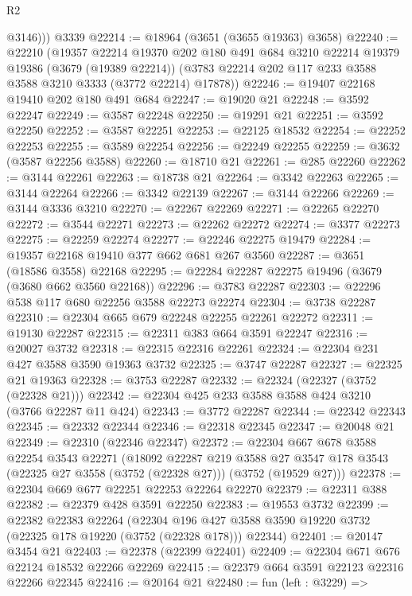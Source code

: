\begin{lexlean}{R2}
\begin{coremodule}
          @3146)))
    @3339
@22214 := @18964 (@3651 (@3655 @19363) @3658)
@22240 := @22210
    (@19357
      @22214
      @19370
      @202
      @180
      @491
      @684
      @3210
      @22214
      @19379
      @19386
      (@3679 (@19389 @22214))
      (@3783 @22214 @202 @117 @233 @3588 @3588 @3210 @3333 (@3772 @22214) @17878))
@22246 := @19407 @22168 @19410 @202 @180 @491 @684
@22247 := @19020 @21
@22248 := @3592 @22247
@22249 := @3587 @22248
@22250 := @19291 @21
@22251 := @3592 @22250
@22252 := @3587 @22251
@22253 := @22125 @18532
@22254 := @22252 @22253
@22255 := @3589 @22254
@22256 := @22249 @22255
@22259 := @3632 (@3587 @22256 @3588)
@22260 := @18710 @21
@22261 := @285 @22260
@22262 := @3144 @22261
@22263 := @18738 @21
@22264 := @3342 @22263
@22265 := @3144 @22264
@22266 := @3342 @22139
@22267 := @3144 @22266
@22269 := @3144 @3336 @3210
@22270 := @22267 @22269
@22271 := @22265 @22270
@22272 := @3544 @22271
@22273 := @22262 @22272
@22274 := @3377 @22273
@22275 := @22259 @22274
@22277 := @22246 @22275 @19479
@22284 := @19357 @22168 @19410 @377 @662 @681 @267 @3560
@22287 := @3651 (@18586 @3558) @22168
@22295 := @22284 @22287 @22275 @19496 (@3679 (@3680 @662 @3560 @22168))
@22296 := @3783 @22287
@22303 := @22296 @538 @117 @680 @22256 @3588 @22273 @22274
@22304 := @3738 @22287
@22310 := @22304 @665 @679 @22248 @22255 @22261 @22272
@22311 := @19130 @22287
@22315 := @22311 @383 @664 @3591 @22247
@22316 := @20027 @3732
@22318 := @22315 @22316 @22261
@22324 := @22304 @231 @427 @3588 @3590 @19363 @3732
@22325 := @3747 @22287
@22327 := @22325 @21 @19363
@22328 := @3753 @22287
@22332 := @22324 (@22327 (@3752 (@22328 @21)))
@22342 := @22304 @425 @233 @3588 @3588 @424 @3210 (@3766 @22287 @11 @424)
@22343 := @3772 @22287
@22344 := @22342 @22343
@22345 := @22332 @22344
@22346 := @22318 @22345
@22347 := @20048 @21
@22349 := @22310 (@22346 @22347)
@22372 := @22304
    @667
    @678
    @3588
    @22254
    @3543
    @22271
    (@18092
      @22287
      @219
      @3588
      @27
      @3547
      @178
      @3543
      (@22325 @27 @3558 (@3752 (@22328 @27)))
      (@3752 (@19529 @27)))
@22378 := @22304 @669 @677 @22251 @22253 @22264 @22270
@22379 := @22311 @388
@22382 := @22379 @428 @3591 @22250
@22383 := @19553 @3732
@22399 := @22382
    @22383
    @22264
    (@22304 @196 @427 @3588 @3590 @19220 @3732 (@22325 @178 @19220 (@3752 (@22328 @178))) @22344)
@22401 := @20147 @3454 @21
@22403 := @22378 (@22399 @22401)
@22409 := @22304 @671 @676 @22124 @18532 @22266 @22269
@22415 := @22379 @664 @3591 @22123 @22316 @22266 @22345
@22416 := @20164 @21
@22480 := fun (left : @3229) =>

\end{coremodule}
\end{lexlean}
